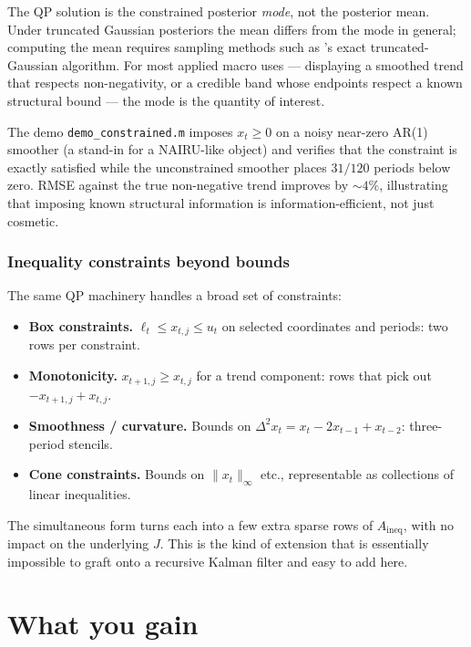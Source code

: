 \documentclass[11pt]{article}
\begin{document}
The QP solution is the constrained posterior \emph{mode}, not the
posterior mean.  Under truncated Gaussian posteriors the mean differs
from the mode in general; computing the mean requires sampling
methods such as \citet{Botev2017}'s exact truncated-Gaussian
algorithm.  For most applied macro uses --- displaying a smoothed
trend that respects non-negativity, or a credible band whose
endpoints respect a known structural bound --- the mode is the
quantity of interest.

The demo \texttt{demo\_constrained.m} imposes $x_t\ge 0$ on a noisy
near-zero AR(1) smoother (a stand-in for a NAIRU-like object) and
verifies that the constraint is exactly satisfied while the
unconstrained smoother places $31/120$ periods below zero.  RMSE
against the true non-negative trend improves by $\sim 4\%$, illustrating
that imposing known structural information is information-efficient,
not just cosmetic.

\subsubsection{Inequality constraints beyond bounds}

The same QP machinery handles a broad set of constraints:
\begin{itemize}[leftmargin=2em]
\item \textbf{Box constraints.}  $\ell_t\le x_{t,j}\le u_t$ on
  selected coordinates and periods: two rows per constraint.
\item \textbf{Monotonicity.}  $x_{t+1,j}\ge x_{t,j}$ for a trend
  component: rows that pick out $-x_{t+1,j}+x_{t,j}$.
\item \textbf{Smoothness / curvature.}  Bounds on
  $\Delta^2 x_t=x_t-2x_{t-1}+x_{t-2}$: three-period stencils.
\item \textbf{Cone constraints.}  Bounds on $\|x_t\|_\infty$ etc.,
  representable as collections of linear inequalities.
\end{itemize}
The simultaneous form turns each into a few extra sparse rows of
$A_{\text{ineq}}$, with no impact on the underlying $J$.  This is
the kind of extension that is essentially impossible to graft onto a
recursive Kalman filter and easy to add here.

\section{What you gain}
\end{document}

